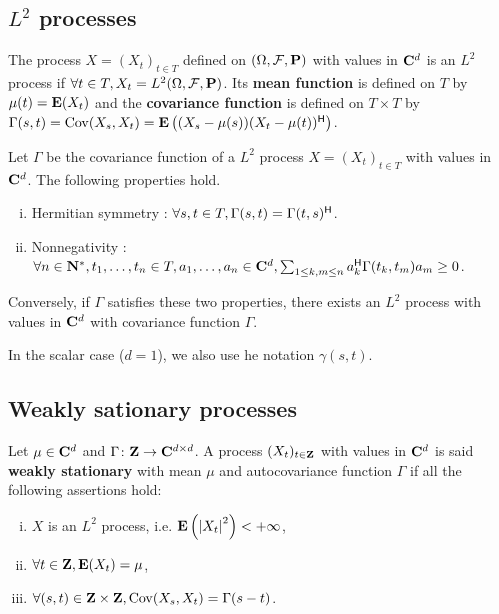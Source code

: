 \subsection{$L^2$ processes}

	\begin{defn}
		The process $X = (X_t)_{t \in T}$ defined on $(\Omega,\mathcal{F},\mathbf{P})$ with values in $\mathbf{C}^d$ is an $L^2$ process if $\forall t \in T, X_t = L^2(\Omega,\mathcal{F},\mathbf{P})$.
		Its \textbf{mean function} is defined on $T$ by $\mu(t) = \mathbf{E}(X_t)$ and the \textbf{covariance function} is defined on $T \times T$ by $\Gamma(s,t) = \operatorname{Cov}(X_s,X_t) = \mathbf{E} \left( (X_s - \mu(s)) (X_t - \mu(t))^\mathsf{H} \right)$.
	\end{defn}

	\begin{pop}
		Let $\Gamma$ be the covariance function of a $L^2$ process $X = (X_t)_{t \in T}$ with values in $\mathbf{C}^d$.
		The following properties hold.
		\begin{enumerate}[(i)]
			\item Hermitian symmetry : $\forall s, t \in T, \Gamma(s,t) = \Gamma(t,s)^\mathsf{H}$.
			\item Nonnegativity : $\forall n \in \mathbf{N}^*, t_1,\ldots, t_n \in T, a_1, \ldots, a_n \in \mathbf{C}^d, \sum_{1 \leq k,m \leq n} a_k^\mathsf{H} \Gamma(t_k,t_m) a_m \geq 0$.
		\end{enumerate}
		Conversely, if $\Gamma$ satisfies these two properties, there exists an $L^2$ process with values in $\mathbf{C}^d$ with covariance function $\Gamma$.
	\end{pop}

	In the scalar case ($d = 1$), we also use he notation $\gamma(s,t)$.

\subsection{Weakly sationary processes}

	\begin{defn}
		Let $\mu \in \mathbf{C}^d$ and $\Gamma \colon \mathbf{Z} \to \mathbf{C}^{d \times d}$.
		A process $(X_t)_{t \in \mathbf{Z}}$ with values in $\mathbf{C}^d$ is said \textbf{weakly stationary} with mean $\mu$ and autocovariance function $\Gamma$ if all the following assertions hold:
		\begin{enumerate}[(i)]
			\item $X$ is an $L^2$ process, i.e. $\mathbf{E} \left( \left\lvert X_t\right\rvert^2 \right) < + \infty$,
			\item $\forall t \in \mathbf{Z}, \mathbf{E}(X_t) = \mu$,
			\item $\forall (s,t) \in \mathbf{Z} \times \mathbf{Z}, \operatorname{Cov}(X_s,X_t) = \Gamma(s - t)$.
		\end{enumerate}
	\end{defn}

